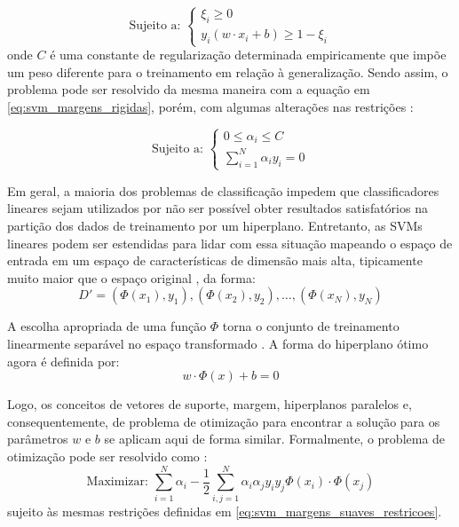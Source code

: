 \begin{equation}
\label{eq:svm_margens_suaves_def_restricoes}
\text{Sujeito a: }
\begin{cases}
    \xi_i \geq 0\\[1em]
    y_i (w \cdot x_i + b) \geq 1 - \xi_i
\end{cases}
\end{equation}
\noindent onde $C$ é uma constante de regularização determinada empiricamente que impõe um peso diferente para o treinamento em relação à generalização. Sendo assim, o problema pode ser resolvido da mesma maneira com a equação em \ref{eq:svm_margens_rigidas}, porém, com algumas alterações nas restrições \citep{lorena:03}:

\begin{equation}
\label{eq:svm_margens_suaves_restricoes}
\text{Sujeito a: }
\begin{cases}
    0 \leq \alpha_i \leq C\\[1em]
    \sum_{i=1}^N \alpha_i y_i = 0
\end{cases}
\end{equation}

Em geral, a maioria dos problemas de classificação impedem que classificadores lineares sejam utilizados por não ser possível obter resultados satisfatórios na partição dos dados de treinamento por um hiperplano. Entretanto, as SVMs lineares podem ser estendidas para lidar com essa situação mapeando o espaço de entrada em um espaço de características de dimensão mais alta, tipicamente muito maior que o espaço original \citep{duda:12}, da forma:
\begin{equation}
\label{eq:svm_dataset_transformado}
    D' = (\Phi(x_1), y_1), (\Phi(x_2), y_2), \ldots, (\Phi(x_N), y_N)
\end{equation}

A escolha apropriada de uma função $\Phi$ torna o conjunto de treinamento linearmente separável no espaço transformado \citep{lorena:03}. A forma do hiperplano ótimo agora é definida por:
\begin{equation}
\label{eq:svm_hyperplano_otimo_trasnformado}
w \cdot \Phi(x) + b = 0
\end{equation}

Logo, os conceitos de vetores de suporte, margem, hiperplanos paralelos e, consequentemente, de problema de otimização para encontrar a solução para os parâmetros $w$ e $b$ se aplicam aqui de forma similar. Formalmente, o problema de otimização pode ser resolvido como \citep{lorena:03}:
\begin{equation}
\label{eq:svm_nao_linear}
\text{Maximizar: } \sum_{i=1}^N \alpha_i - \frac{1}{2} \sum_{i, j=1}^N \alpha_i \alpha_j y_i y_j \Phi(x_i)\cdot \Phi(x_j)
\end{equation}
\noindent sujeito às mesmas restrições definidas em \ref{eq:svm_margens_suaves_restricoes}.

